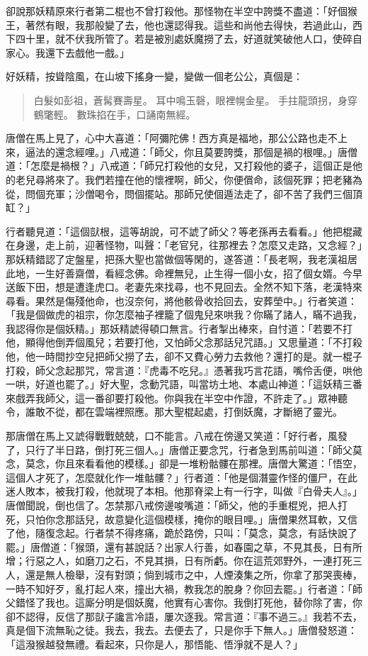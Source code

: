 卻說那妖精原來行者第二棍也不曾打殺他。那怪物在半空中誇獎不盡道：「好個猴王，著然有眼，我那般變了去，他也還認得我。這些和尚他去得快，若過此山，西下四十里，就不伏我所管了。若是被別處妖魔撈了去，好道就笑破他人口，使碎自家心。我還下去戲他一戲。」

好妖精，按聳陰風，在山坡下搖身一變，變做一個老公公，真個是：
\begin{quote}
白髮如彭祖，蒼髯賽壽星。
耳中鳴玉磬，眼裡幌金星。
手拄龍頭拐，身穿鶴氅輕。
數珠掐在手，口誦南無經。
\end{quote}

唐僧在馬上見了，心中大喜道：「阿彌陀佛！西方真是福地，那公公路也走不上來，逼法的還念經哩。」八戒道：「師父，你且莫要誇獎，那個是禍的根哩。」唐僧道：「怎麼是禍根？」八戒道：「師兄打殺他的女兒，又打殺他的婆子，這個正是他的老兒尋將來了。我們若撞在他的懷裡啊，師父，你便償命，該個死罪；把老豬為從，問個充軍；沙僧喝令，問個擺站。那師兄使個遁法走了，卻不苦了我們三個頂缸？」

行者聽見道：「這個獃根，這等胡說，可不諕了師父？等老孫再去看看。」他把棍藏在身邊，走上前，迎著怪物，叫聲：「老官兒，往那裡去？怎麼又走路，又念經？」那妖精錯認了定盤星，把孫大聖也當做個等閑的，遂答道：「長老啊，我老漢祖居此地，一生好善齋僧，看經念佛。命裡無兒，止生得一個小女，招了個女婿。今早送飯下田，想是遭逢虎口。老妻先來找尋，也不見回去。全然不知下落，老漢特來尋看。果然是傷殘他命，也沒奈何，將他骸骨收拾回去，安葬塋中。」行者笑道：「我是個做虎的祖宗，你怎麼袖子裡籠了個鬼兒來哄我？你瞞了諸人，瞞不過我，我認得你是個妖精。」那妖精諕得頓口無言。行者掣出棒來，自忖道：「若要不打他，顯得他倒弄個風兒；若要打他，又怕師父念那話兒咒語。」又思量道：「不打殺他，他一時間抄空兒把師父撈了去，卻不又費心勞力去救他？還打的是。就一棍子打殺，師父念起那咒，常言道：『虎毒不吃兒。』憑著我巧言花語，嘴伶舌便，哄他一哄，好道也罷了。」好大聖，念動咒語，叫當坊土地、本處山神道：「這妖精三番來戲弄我師父，這一番卻要打殺他。你與我在半空中作證，不許走了。」眾神聽令，誰敢不從，都在雲端裡照應。那大聖棍起處，打倒妖魔，才斷絕了靈光。

那唐僧在馬上又諕得戰戰兢兢，口不能言。八戒在傍邊又笑道：「好行者，風發了，只行了半日路，倒打死三個人。」唐僧正要念咒，行者急到馬前叫道：「師父莫念，莫念，你且來看看他的模樣。」卻是一堆粉骷髏在那裡。唐僧大驚道：「悟空，這個人才死了，怎麼就化作一堆骷髏？」行者道：「他是個潛靈作怪的僵尸，在此迷人敗本，被我打殺，他就現了本相。他那脊梁上有一行字，叫做『白骨夫人』。」唐僧聞說，倒也信了。怎禁那八戒傍邊唆嘴道：「師父，他的手重棍兇，把人打死，只怕你念那話兒，故意變化這個模樣，掩你的眼目哩。」唐僧果然耳軟，又信了他，隨復念起。行者禁不得疼痛，跪於路傍，只叫：「莫念，莫念，有話快說了罷。」唐僧道：「猴頭，還有甚說話？出家人行善，如春園之草，不見其長，日有所增；行惡之人，如磨刀之石，不見其損，日有所虧。你在這荒郊野外，一連打死三人，還是無人檢舉，沒有對頭；倘到城市之中，人煙湊集之所，你拿了那哭喪棒，一時不知好歹，亂打起人來，撞出大禍，教我怎的脫身？你回去罷。」行者道：「師父錯怪了我也。這廝分明是個妖魔，他實有心害你。我倒打死他，替你除了害，你卻不認得，反信了那獃子讒言冷語，屢次逐我。常言道：『事不過三。』我若不去，真是個下流無恥之徒。我去，我去。去便去了，只是你手下無人。」唐僧發怒道：「這潑猴越發無禮。看起來，只你是人，那悟能、悟淨就不是人？」

